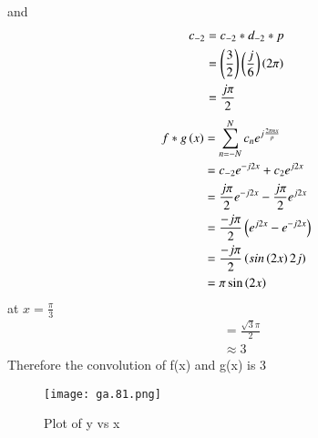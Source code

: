 \documentclass[journal,12pt,twocolumn]{IEEEtran}
\theoremstyle{remark}
\begin{document}
and
\begin{align}
    c_{-2}&=c_{-2}*d_{-2}*p\\
    &=\left(\frac{3}{2}\right)\left(\frac{j}{6}\right)\left(2\pi\right)\\
    &=\frac{j\pi}{2}
\end{align}
\begin{align}
   {f*g}\left(x\right)&=\sum_{n=-N}^{N}c_{n} e^{j\frac{2\pi nx}{p}}\\
    &=c_{-2}e^{-j2x} + c_{2}e^{j2x}\\
    &=\frac{j\pi}{2}e^{-j2x}-\frac{j\pi}{2}e^{j2x}\\
    &=\frac{-j\pi}{2}\left(e^{j2x}-e^{-j2x}\right)\\
    &=\frac{-j\pi}{2}\left(sin\left(2x\right)2j\right)\\
    &=\pi \sin\left(2x\right)\\
\end{align}
at $x=\frac{\pi}{3}$
\begin{align}
    &=\frac{\sqrt{3}\pi}{2}\\
    &\approx 3
\end{align}
Therefore the convolution of f(x) and g(x) is 3
\begin{figure}[!h]
    \centering
    \texttt{[image: ga.81.png]}
    \caption{Plot of y vs x}
    \label{fig:1}
\end{figure}
\end{document}
